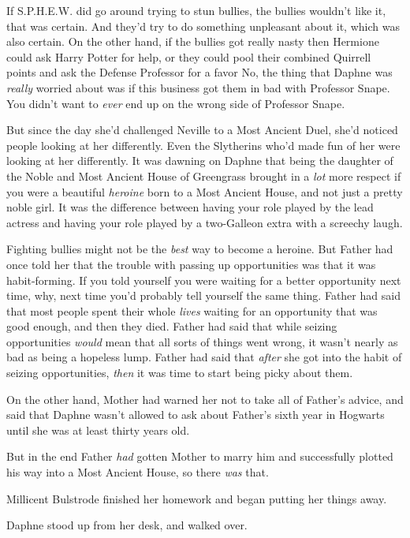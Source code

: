 If S.P.H.E.W. did go around trying to stun bullies, the bullies wouldn't like
it, that was certain. And they'd try to do something unpleasant about it, which
was also certain. On the other hand, if the bullies got really nasty then
Hermione could ask Harry Potter for help, or they could pool their combined
Quirrell points and ask the Defense Professor for a favor{\el} No, the thing
that Daphne was \emph{really} worried about was if this business got them in
bad with Professor Snape. You didn't want to \emph{ever} end up on the wrong
side of Professor Snape.

But since the day she'd challenged Neville to a Most Ancient Duel, she'd
noticed people looking at her differently. Even the Slytherins who'd made fun
of her were looking at her differently. It was dawning on Daphne that being the
daughter of the Noble and Most Ancient House of Greengrass brought in a
\emph{lot} more respect if you were a beautiful \emph{heroine} born to a Most
Ancient House, and not just a pretty noble girl. It was the difference between
having your role played by the lead actress and having your role played by a
two-Galleon extra with a screechy laugh.

Fighting bullies might not be the \emph{best} way to become a heroine. But
Father had once told her that the trouble with passing up opportunities was
that it was habit-forming. If you told yourself you were waiting for a better
opportunity next time, why, next time you'd probably tell yourself the same
thing. Father had said that most people spent their whole \emph{lives} waiting
for an opportunity that was good enough, and then they died. Father had said
that while seizing opportunities \emph{would} mean that all sorts of things
went wrong, it wasn't nearly as bad as being a hopeless lump. Father had said
that \emph{after} she got into the habit of seizing opportunities, \emph{then}
it was time to start being picky about them.

On the other hand, Mother had warned her not to take all of Father's advice,
and said that Daphne wasn't allowed to ask about Father's sixth year in
Hogwarts until she was at least thirty years old.

But in the end Father \emph{had} gotten Mother to marry him and successfully
plotted his way into a Most Ancient House, so there \emph{was} that.

Millicent Bulstrode finished her homework and began putting her things away.

Daphne stood up from her desk, and walked over.

